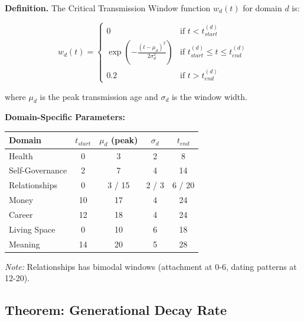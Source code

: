 \begin{tcolorbox}[colback=gray!5!white, colframe=gray!75!black, title=Definition BI-D5: Window Function]
\textbf{Definition.} The Critical Transmission Window function $w_d(t)$ for domain $d$ is:

\begin{equation}
w_d(t) = \begin{cases}
0 & \text{if } t < t^{(d)}_{start} \\
\exp\left(-\frac{(t - \mu_d)^2}{2\sigma_d^2}\right) & \text{if } t^{(d)}_{start} \leq t \leq t^{(d)}_{end} \\
0.2 & \text{if } t > t^{(d)}_{end}
\end{cases}
\label{eq:bi-window-function}
\end{equation}

where $\mu_d$ is the peak transmission age and $\sigma_d$ is the window width.

\textbf{Domain-Specific Parameters:}
\begin{center}
\small
\begin{tabular}{@{}lcccc@{}}
\toprule
\textbf{Domain} & $t_{start}$ & $\mu_d$ (peak) & $\sigma_d$ & $t_{end}$ \\
\midrule
Health & 0 & 3 & 2 & 8 \\
Self-Governance & 2 & 7 & 4 & 14 \\
Relationships & 0 & 3 / 15 & 2 / 3 & 6 / 20 \\
Money & 10 & 17 & 4 & 24 \\
Career & 12 & 18 & 4 & 24 \\
Living Space & 0 & 10 & 6 & 18 \\
Meaning & 14 & 20 & 5 & 28 \\
\bottomrule
\end{tabular}
\end{center}

\textit{Note:} Relationships has bimodal windows (attachment at 0-6, dating patterns at 12-20).
\end{tcolorbox}

\subsection{Theorem: Generational Decay Rate}

